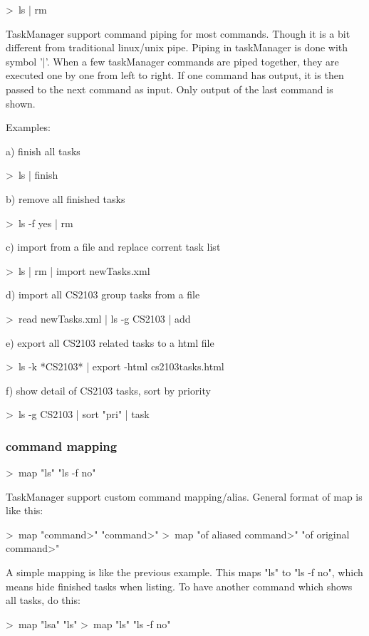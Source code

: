 \documentclass[12pt, a4paper]{article}
\begin{document}
    \textgreater \ ls | rm

TaskManager support command piping for most commands. Though it is a bit different from traditional linux/unix pipe.
Piping in taskManager is done with symbol '|'. When a few taskManager commands are piped together, they are executed one by one from left to right. 
If one command has output, it is then passed to the next command as input. Only output of the last command is shown.

Examples:
    
a) finish all tasks 

    \textgreater \ ls | finish

b) remove all finished tasks

    \textgreater \ ls -f yes | rm

c) import from a file and replace corrent task list

    \textgreater \ ls | rm | import newTasks.xml

d) import all CS2103 group tasks from a file

    \textgreater \ read newTasks.xml | ls -g CS2103 | add

e) export all CS2103 related tasks to a html file
    
    \textgreater \ ls -k *CS2103* | export -html cs2103tasks.html

f) show detail of CS2103 tasks, sort by priority

    \textgreater \ ls -g CS2103 | sort "pri" | task


\subsubsection{command mapping}

    \textgreater \ map "ls" "ls -f no"

TaskManager support custom command mapping/alias. General format of map is like this:

    \textgreater \ map "\textlessnew command\textgreater" "\textlessoriginal command\textgreater"
    \textgreater \ map "\textlesspattern of aliased command\textgreater" "\textlesspattern of original command\textgreater"

A simple mapping is like the previous example. This maps "ls" to "ls -f no", which means hide finished tasks when listing.
To have another command which shows all tasks, do this:

    \textgreater \ map "lsa" "ls"
    \textgreater \ map "ls" "ls -f no"
\end{document}
